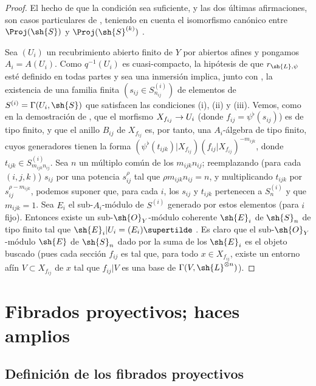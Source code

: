 \documentclass[oneside,10pt]{amsart}
\makeatletter
\newcommand{\ega@arrow}[2]{\mathchoice{#1}{#2}{#2}{#2}}
\renewcommand{\to}{\ega@arrow{\longrightarrow}{\rightarrow}}
\newcommand{\oldpage}[2][]{\marginnote{\normalfont\footnotesize\textbf{#1}~|~#2}\ignorespaces}
\let\EGAOriginalLabel\label
\renewcommand{\label}[1]{\phantomsection\EGAOriginalLabel{#1}}
\makeatother
\begin{document}
\begin{proof}
El hecho de que la condición sea suficiente, y las dos últimas afirmaciones, son casos particulares de , teniendo en cuenta el isomorfismo canónico entre $\Proj(\sh{S})$ y $\Proj(\sh{S}^{(k)})$ .

Sea $(U_i)$ un recubrimiento abierto finito de $Y$ por abiertos afines y pongamos $A_i=A(U_i)$.
Como $q^{-1}(U_i)$ es cuasi-compacto, la hipótesis de que $r_{\sh{L},\psi}$ esté definido en todas partes y sea una inmersión implica, junto con , la existencia de una familia finita $(s_{ij}\in S_{n_{ij}}^{(i)})$ de elementos de $S^{(i)}=\Gamma(U_i,\sh{S})$ que satisfacen las condiciones (i), (ii) y (iii).
Vemos, como en la demostración de , que el morfismo $X_{f_{ij}}\to U_i$ (donde $f_{ij}=\psi^\flat(s_{ij})$) es de tipo finito, y que el anillo $B_{ij}$ de $X_{f_{ij}}$ es, por tanto, una $A_i$-álgebra de tipo finito, cuyos generadores tienen la forma $(\psi^\flat(t_{ijk})|X_{f_{ij}})(f_{ij}|X_{f_{ij}})^{-m_{ijk}}$, donde $t_{ijk}\in S_{m_{ijk}n_{ij}}^{(i)}$.
Sea $n$ un múltiplo común de los $m_{ijk}n_{ij}$;
reemplazando (para cada $(i,j,k)$) $s_{ij}$ por una potencia $s_{ij}^\rho$ tal que $\rho m_{ijk}n_{ij}=n$, y multiplicando $t_{ijk}$ por $s_{ij}^{\rho-m_{ijk}}$, podemos suponer que, para cada $i$, los $s_{ij}$ y $t_{ijk}$ pertenecen a $S_n^{(i)}$ y que $m_{ijk}=1$.
Sea $E_i$ el sub-$A_i$-módulo de $S^{(i)}$ generado por estos elementos (para $i$ fijo).
Entonces existe un sub-$\sh{O}_Y$-módulo coherente $\sh{E}_i$ de $\sh{S}_n$ de tipo finito tal que $\sh{E}_i|U_i=(E_i)\supertilde$ .
\oldpage[II]{71}
Es claro que el sub-$\sh{O}_Y$-módulo $\sh{E}$ de $\sh{S}_n$ dado por la suma de los $\sh{E}_i$ es el objeto buscado (pues cada sección $f_{ij}$ es tal que, para todo $x\in X_{f_{ij}}$, existe un entorno afín $V\subset X_{f_{ij}}$ de $x$ tal que $f_{ij}|V$ es una base de $\Gamma(V,\sh{L}^{\otimes n})$).
\end{proof}

\section{Fibrados proyectivos; haces amplios}
\label{section:II.4}

\subsection{Definición de los fibrados proyectivos}
\label{subsection:II.4.1}
\end{document}
